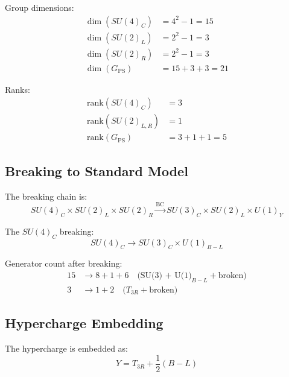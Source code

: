 \documentclass[11pt,a4paper]{article}
\begin{document}
Group dimensions:
\begin{align}
\label{eq:ps-dim-su4}
\dim(SU(4)_C) &= 4^2 - 1 = 15 \\
\label{eq:ps-dim-su2l}
\dim(SU(2)_L) &= 2^2 - 1 = 3 \\
\label{eq:ps-dim-su2r}
\dim(SU(2)_R) &= 2^2 - 1 = 3 \\
\label{eq:ps-dim-total}
\dim(G_{\text{PS}}) &= 15 + 3 + 3 = 21
\end{align}

Ranks:
\begin{align}
\label{eq:ps-rank-su4}
\text{rank}(SU(4)_C) &= 3 \\
\label{eq:ps-rank-su2}
\text{rank}(SU(2)_{L,R}) &= 1 \\
\label{eq:ps-rank-total}
\text{rank}(G_{\text{PS}}) &= 3 + 1 + 1 = 5
\end{align}

\subsection{Breaking to Standard Model}
\label{subsec:breaking}

The breaking chain is:
\begin{equation}
\label{eq:breaking-chain}
SU(4)_C \times SU(2)_L \times SU(2)_R \xrightarrow{\text{BC}} SU(3)_C \times SU(2)_L \times U(1)_Y
\end{equation}

The $SU(4)_C$ breaking:
\begin{equation}
\label{eq:su4-breaking}
SU(4)_C \to SU(3)_C \times U(1)_{B-L}
\end{equation}

Generator count after breaking:
\begin{align}
\label{eq:broken-su4}
15 &\to 8 + 1 + 6 \quad \text{(SU(3) + U(1)}_{B-L} + \text{broken)} \\
\label{eq:broken-su2r}
3 &\to 1 + 2 \quad \text{(}T_{3R} + \text{broken)}
\end{align}

\subsection{Hypercharge Embedding}
\label{subsec:hypercharge}

The hypercharge is embedded as:
\begin{equation}
\label{eq:hypercharge-embedding}
\boxed{Y = T_{3R} + \frac{1}{2}(B - L)}
\end{equation}
\end{document}
